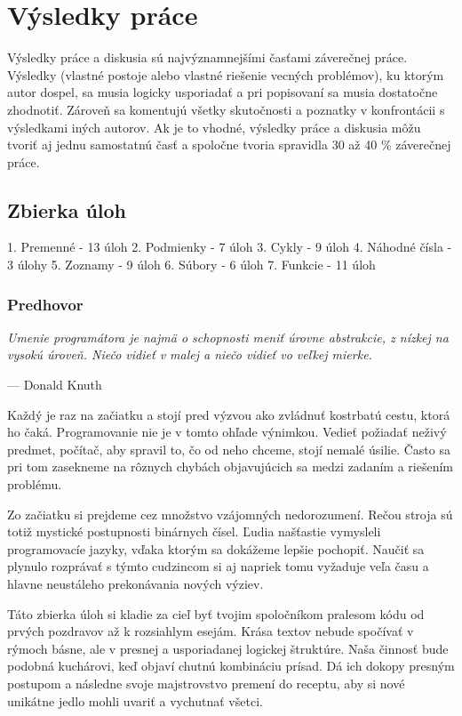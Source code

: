 \chapter{Výsledky práce}
Výsledky práce a diskusia sú najvýznamnejšími časťami záverečnej práce. Výsledky (vlastné postoje alebo vlastné riešenie vecných problémov), ku ktorým autor dospel, sa musia logicky usporiadať a pri popisovaní sa musia dostatočne zhodnotiť. Zároveň sa komentujú všetky skutočnosti a poznatky v konfrontácii s výsledkami iných autorov. Ak je to vhodné, výsledky práce a diskusia môžu tvoriť aj jednu samostatnú časť a spoločne tvoria spravidla 30 až 40 \% záverečnej práce.

\section{Zbierka úloh}

1. Premenné - 13 úloh
2. Podmienky - 7 úloh
3. Cykly - 9 úloh
4. Náhodné čísla - 3 úlohy
5. Zoznamy - 9 úloh
6. Súbory - 6 úloh
7. Funkcie - 11 úloh

\subsection{Predhovor}
\setlength\epigraphwidth{12cm}
\setlength\epigraphrule{0pt}
\epigraph{\small\itshape Umenie programátora je najmä o schopnosti meniť úrovne abstrakcie, z nízkej na vysokú úroveň. Niečo vidieť v malej a niečo vidieť vo veľkej mierke.}{--- \textup{Donald Knuth}}

Každý je raz na začiatku a stojí pred výzvou ako zvládnuť kostrbatú cestu, ktorá ho čaká.  Programovanie nie je v tomto ohľade výnimkou. Vedieť požiadať neživý predmet, počítač, aby  spravil to, čo od neho chceme, stojí nemalé úsilie. Často sa pri tom zasekneme na rôznych  chybách objavujúcich sa medzi zadaním a riešením problému. 

Zo začiatku si prejdeme cez množstvo vzájomných nedorozumení. Rečou stroja sú totiž mystické  postupnosti binárnych čísel. Ľudia našťastie vymysleli programovacíe jazyky, vďaka ktorým sa  dokážeme lepšie pochopiť. Naučiť sa plynulo rozprávať s týmto cudzincom si aj napriek tomu  vyžaduje veľa času a hlavne neustáleho prekonávania nových výziev.

Táto zbierka úloh si kladie za cieľ byť tvojim spoločníkom pralesom kódu od prvých pozdravov až k rozsiahlym esejám. Krása textov nebude spočívať v rýmoch básne, ale v presnej a usporiadanej logickej štruktúre. Naša činnosť bude podobná kuchárovi, keď objaví chutnú kombináciu prísad. Dá ich dokopy presným postupom a následne svoje majstrovstvo premení do receptu, aby si nové unikátne jedlo mohli uvariť a vychutnať všetci.

